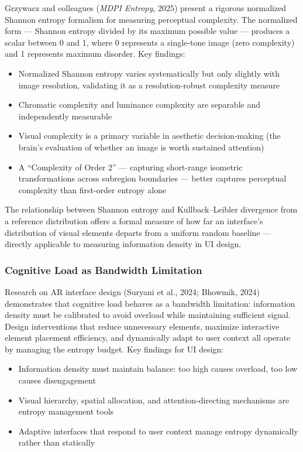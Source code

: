 \documentclass[11pt,letterpaper]{article}
\begin{document}
Grzywacz and colleagues (\textit{MDPI Entropy}, 2025) present a rigorous normalized Shannon entropy formalism for measuring perceptual complexity. The normalized form --- Shannon entropy divided by its maximum possible value --- produces a scalar between 0 and 1, where 0 represents a single-tone image (zero complexity) and 1 represents maximum disorder. Key findings:

\begin{itemize}[itemsep=0.3em]
  \item Normalized Shannon entropy varies systematically but only slightly with image resolution, validating it as a resolution-robust complexity measure
  \item Chromatic complexity and luminance complexity are separable and independently measurable
  \item Visual complexity is a primary variable in aesthetic decision-making (the brain's evaluation of whether an image is worth sustained attention)
  \item A ``Complexity of Order 2'' --- capturing short-range isometric transformations across subregion boundaries --- better captures perceptual complexity than first-order entropy alone
\end{itemize}

The relationship between Shannon entropy and Kullback--Leibler divergence from a reference distribution offers a formal measure of how far an interface's distribution of visual elements departs from a uniform random baseline --- directly applicable to measuring information density in UI design.

\subsubsection{Cognitive Load as Bandwidth Limitation}

Research on AR interface design (Suryani et al., 2024; Bhowmik, 2024) demonstrates that cognitive load behaves as a bandwidth limitation: information density must be calibrated to avoid overload while maintaining sufficient signal. Design interventions that reduce unnecessary elements, maximize interactive element placement efficiency, and dynamically adapt to user context all operate by managing the entropy budget. Key findings for UI design:

\begin{itemize}[itemsep=0.3em]
  \item Information density must maintain balance: too high causes overload, too low causes disengagement
  \item Visual hierarchy, spatial allocation, and attention-directing mechanisms are entropy management tools
  \item Adaptive interfaces that respond to user context manage entropy dynamically rather than statically
\end{itemize}
\end{document}
